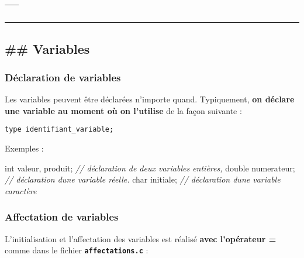 \documentclass[11pt]{article}
\newenvironment{Shaded}{}{}
\newcommand{\DataTypeTok}[1]{\textcolor[rgb]{0.56,0.13,0.00}{{#1}}}
\newcommand{\CommentTok}[1]{\textcolor[rgb]{0.38,0.63,0.69}{\textit{{#1}}}}
\newcommand{\NormalTok}[1]{{#1}}
\begin{document}
    \hypertarget{section}{%
\subsection{---}\label{section}}

\begin{center}\rule{0.5\linewidth}{0.5pt}\end{center}

    \hypertarget{variables}{%
\subsection{\#\# Variables}\label{variables}}

    \hypertarget{duxe9claration-de-variables}{%
\subsubsection{Déclaration de
variables}\label{duxe9claration-de-variables}}

Les variables peuvent être déclarées n'importe quand. Typiquement,
\textbf{on déclare une variable au moment où on l'utilise} de la façon
suivante :

\texttt{type\ identifiant\_variable;}

Exemples :

\begin{Shaded}
\begin{Highlighting}[]
\DataTypeTok{int}\NormalTok{ valeur, produit; }\CommentTok{// déclaration de deux variables entières, }
\DataTypeTok{double}\NormalTok{ numerateur; }\CommentTok{// déclaration d\textquotesingle{}une variable réelle.}
\DataTypeTok{char}\NormalTok{ initiale; }\CommentTok{// déclaration d\textquotesingle{}une variable caractère}
\end{Highlighting}
\end{Shaded}

\hypertarget{affectation-de-variables}{%
\subsubsection{Affectation de
variables}\label{affectation-de-variables}}

L'initialisation et l'affectation des variables est réalisé \textbf{avec
l'opérateur =} comme dans le fichier \textbf{\texttt{affectations.c}} :
\end{document}
